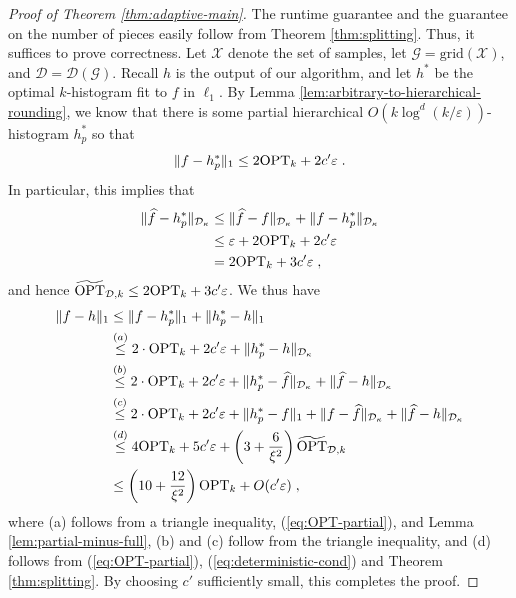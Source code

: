 \documentclass[final,12pt]{colt2018} %
\newcommand{\eps}{\varepsilon}
\newcommand{\hier}{\mathcal{D}}
\newcommand{\calX}{\mathcal{X}}
\newcommand{\calG}{\mathcal{G}}
\newcommand{\fhat}{\widehat{f}}
\newcommand{\tOPT}{\widetilde{\OPT}}
\newcommand{\grid}{\mathrm{grid}}
\begin{document}
\begin{proof}[Proof of Theorem \ref{thm:adaptive-main}]
The runtime guarantee and the guarantee on the number of pieces easily follow 
from Theorem \ref{thm:splitting}.
Thus, it suffices to prove correctness.
Let $\calX$ denote the set of samples, let $\calG = \grid (\calX)$, and $\hier = \hier(\calG)$.
Recall $h$ is the output of our algorithm, and let $h^*$ be the optimal $k$-histogram fit to $f$ in $\ell_1$.
By Lemma \ref{lem:arbitrary-to-hierarchical-rounding}, we know that there 
is some partial hierarchical $O(k \log^d (k / \eps))$-histogram $h^*_p$ so that
\begin{equation}
\label{eq:OPT-partial}
\| f - h^*_p \|_1 \leq 2 \OPT_k + 2 c' \eps \; .
\end{equation}
In particular, this implies that 
\begin{align*}
\| \fhat - h^*_p \|_{\hier_{\kappa}} &\leq \| \fhat - f \|_{\hier_{\kappa}} + \| f - h^*_p \|_{\hier_{\kappa}} 
\\
&\leq \eps +  2 \OPT_k + 2 c' \eps \\
&= 2 \OPT_k + 3 c' \eps \; ,
\end{align*}
and hence $\tOPT_{\hier, k} \leq 2 \OPT_k + 3 c' \eps$.
We thus have 
\begin{align*}
\| f - h \|_1 &\leq \| f - h^*_p \|_1 + \| h^*_p - h \|_1 \\
&\stackrel{(a)}{\leq} 2 \cdot \OPT_k + 2 c' \eps + \| h^*_p - h \|_{\hier_{\kappa}} \\
&\stackrel{(b)}{\leq} 2 \cdot \OPT_k + 2 c' \eps + \| h^*_p - \fhat \|_{\hier_{\kappa}} + \| \fhat - h \|_{\hier_{\kappa}} \\
&\stackrel{(c)}{\leq} 2 \cdot \OPT_k + 2 c' \eps + \| h^*_p - f \|_1 + \| f - \fhat \|_{\hier_{\kappa}} + \| \fhat - h \|_{\hier_{\kappa}} \\
&\stackrel{(d)}{\leq} 4 \OPT_k + 5 c' \eps + \left( 3 + \frac{6}{\xi^2} \right) \tOPT_{\hier, k} \\
&\leq \left( 10 + \frac{12}{\xi^2} \right) \OPT_k + O(c' \eps) \; ,
\end{align*}
where (a) follows from a triangle inequality, (\ref{eq:OPT-partial}), 
and Lemma \ref{lem:partial-minus-full}, (b) and (c) follow from the triangle inequality, 
and (d) follows from (\ref{eq:OPT-partial}), (\ref{eq:deterministic-cond}) and Theorem \ref{thm:splitting}.
By choosing $c'$ sufficiently small, this completes the proof.
\end{proof}

\newpage
\end{document}
